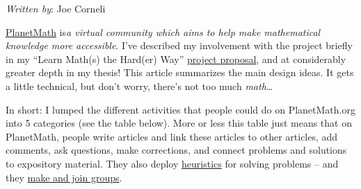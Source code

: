 \emph{Written by}: Joe Corneli

\href{planetmath.org}{PlanetMath} is\emph{a virtual community which aims
to help make mathematical knowledge more accessible}. I've described my
involvement with the project briefly in my ``Learn Math(s) the Hard(er)
Way''
\href{http://campus.ftacademy.org/wiki/index.php/Seed\_Project:\_Learn\_Math\_the\_Hard\_Way}{project
proposal}, and at considerably greater depth in my thesis! This article
summarizes the main design ideas. It gets a little technical, but don't
worry, there's not too much \emph{math}\ldots{}

In short: I lumped the different activities that people could do on
PlanetMath.org into 5 categories (see the table below). More or less
this table just means that on PlanetMath, people write articles and link
these articles to other articles, add comments, ask questions, make
corrections, and connect problems and solutions to expository material.
They also deploy
\href{http://peeragogy.org/patterns-usecases/patterns-and-heuristics/}{heuristics}
for solving problems -- and they
\href{http://peeragogy.org/convening-group/}{make and join groups}.

